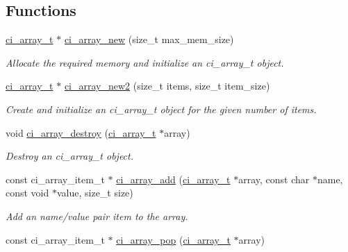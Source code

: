 \subsection*{Functions}
\begin{DoxyCompactItemize}
\item 
\hyperlink{group__SIMPLE__ARRAYS_ga1bec5de79ca98bb53c039a8f8e959137}{ci\_\-array\_\-t} $\ast$ \hyperlink{group__SIMPLE__ARRAYS_ga2ea1f00c1df7ca10c9a612891d085bef}{ci\_\-array\_\-new} (size\_\-t max\_\-mem\_\-size)
\begin{DoxyCompactList}\small\item\em Allocate the required memory and initialize an ci\_\-array\_\-t object. \item\end{DoxyCompactList}\item 
\hyperlink{group__SIMPLE__ARRAYS_ga1bec5de79ca98bb53c039a8f8e959137}{ci\_\-array\_\-t} $\ast$ \hyperlink{group__SIMPLE__ARRAYS_gaeec8ec3aaee4be84d57b1f0e19abcfba}{ci\_\-array\_\-new2} (size\_\-t items, size\_\-t item\_\-size)
\begin{DoxyCompactList}\small\item\em Create and initialize an ci\_\-array\_\-t object for the given number of items. \item\end{DoxyCompactList}\item 
void \hyperlink{group__SIMPLE__ARRAYS_ga41a031d46e1c8341d0f442dfe849e29b}{ci\_\-array\_\-destroy} (\hyperlink{group__SIMPLE__ARRAYS_ga1bec5de79ca98bb53c039a8f8e959137}{ci\_\-array\_\-t} $\ast$array)
\begin{DoxyCompactList}\small\item\em Destroy an ci\_\-array\_\-t object. \item\end{DoxyCompactList}\item 
const ci\_\-array\_\-item\_\-t $\ast$ \hyperlink{group__SIMPLE__ARRAYS_gae6044b8963155a903f5685c2681c2c57}{ci\_\-array\_\-add} (\hyperlink{group__SIMPLE__ARRAYS_ga1bec5de79ca98bb53c039a8f8e959137}{ci\_\-array\_\-t} $\ast$array, const char $\ast$name, const void $\ast$value, size\_\-t size)
\begin{DoxyCompactList}\small\item\em Add an name/value pair item to the array. \item\end{DoxyCompactList}\item 
const ci\_\-array\_\-item\_\-t $\ast$ \hyperlink{group__SIMPLE__ARRAYS_ga87cf1f8199d58d2138f22697f611d76f}{ci\_\-array\_\-pop} (\hyperlink{group__SIMPLE__ARRAYS_ga1bec5de79ca98bb53c039a8f8e959137}{ci\_\-array\_\-t} $\ast$array)

\end{DoxyCompactItemize}
